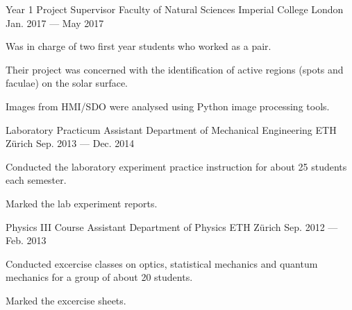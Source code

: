 
\begin{cventries}

  \cventry
    {Year 1 Project Supervisor} %
    {Faculty of Natural Sciences} %
    {Imperial College London} %
    {Jan. 2017 --- May 2017} %
    {
      \begin{cvitems} %
        \item {Was in charge of two first year students who worked as a pair.}
        \item {Their project was concerned with the identification of active regions (spots and faculae) on the solar surface.}
        \item {Images from HMI/SDO were analysed using Python image processing tools.}
      \end{cvitems}
    }

  \cventry
    {Laboratory Practicum Assistant} %
    {Department of Mechanical Engineering} %
    {ETH Z{\"u}rich} %
    {Sep. 2013 --- Dec. 2014} %
    {
      \begin{cvitems} %
        \item {Conducted the laboratory experiment practice instruction for about 25 students each semester.}
        \item {Marked the lab experiment reports.}
      \end{cvitems}
    }

  \cventry
    {Physics III Course Assistant} %
    {Department of Physics} %
    {ETH Z{\"u}rich} %
    {Sep. 2012 --- Feb. 2013} %
    {
      \begin{cvitems} %
        \item {Conducted excercise classes on optics, statistical mechanics and quantum mechanics for a group of about 20 students.}
        \item {Marked the excercise sheets.} 
      \end{cvitems}
    }


\end{cventries}
